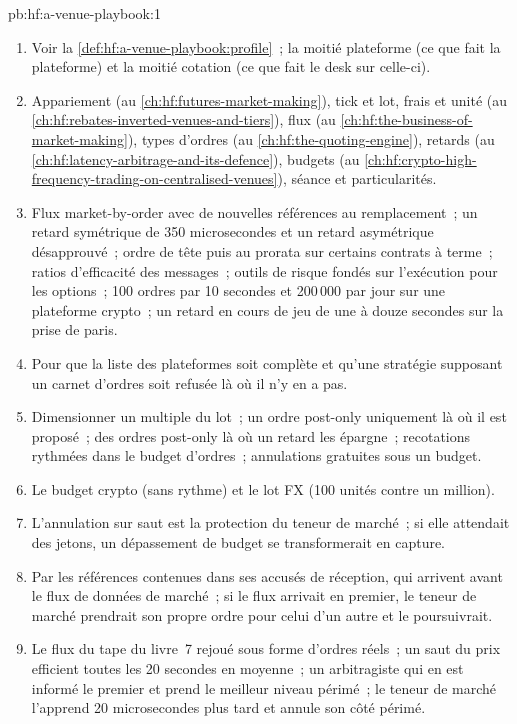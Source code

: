 \begin{solution}{pb:hf:a-venue-playbook:1}
\begin{enumerate}
\item Voir la \cref{def:hf:a-venue-playbook:profile}~; la moitié plateforme (ce que fait la plateforme) et la moitié cotation (ce que fait le desk sur celle-ci).
\item Appariement (au \cref{ch:hf:futures-market-making}), tick et lot, frais et unité (au \cref{ch:hf:rebates-inverted-venues-and-tiers}), flux
(au \cref{ch:hf:the-business-of-market-making}), types d'ordres (au \cref{ch:hf:the-quoting-engine}), retards (au \cref{ch:hf:latency-arbitrage-and-its-defence}),
budgets (au \cref{ch:hf:crypto-high-frequency-trading-on-centralised-venues}), séance et particularités.
\item Flux market-by-order avec de nouvelles références au remplacement~; un retard symétrique de 350 microsecondes et un retard asymétrique désapprouvé~; ordre de tête puis au
prorata sur certains contrats à terme~; ratios d'efficacité des messages~; outils de risque fondés sur l'exécution pour les options~; 100 ordres par 10 secondes et 200\,000 par jour sur une
plateforme crypto~; un retard en cours de jeu de une à douze secondes sur la prise de paris.
\item Pour que la liste des plateformes soit complète et qu'une stratégie supposant un carnet d'ordres soit refusée là où il n'y en a pas.
\item Dimensionner un multiple du lot~; un ordre post-only uniquement là où il est proposé~; des ordres post-only là où un retard les épargne~; recotations rythmées dans le budget d'ordres~;
annulations gratuites sous un budget.
\item Le budget crypto (sans rythme) et le lot FX (100 unités contre un million).
\item L'annulation sur saut est la protection du teneur de marché~; si elle attendait des jetons, un dépassement de budget se transformerait en capture.
\item Par les références contenues dans ses accusés de réception, qui arrivent avant le flux de données de marché~; si le flux arrivait en premier, le teneur de marché prendrait son propre ordre pour
celui d'un autre et le poursuivrait.
\item Le flux du tape du livre~7 rejoué sous forme d'ordres réels~; un saut du prix efficient toutes les 20 secondes en moyenne~; un arbitragiste qui en est informé le premier
et prend le meilleur niveau périmé~; le teneur de marché l'apprend 20 microsecondes plus tard et annule son côté périmé.

\end{enumerate}
\end{solution}
